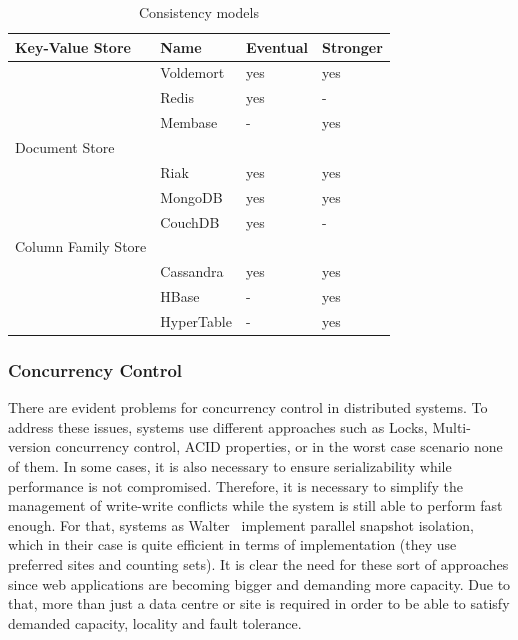 \begin{table}[h]
		\begin{center}
    			\begin{tabular}{ | p{5cm} | l | l | l |}
   			\hline
			Key-Value Store & Name & Eventual & Stronger \\ \hline   		
			 & Voldemort & yes & yes\\ \hline
			 & Redis & yes & - \\ \hline
			 & Membase & - & yes\\ \hline
			
			Document Store &  &  & \\ \hline
			 & Riak & yes & yes \\ \hline			
			 & MongoDB & yes & yes \\ \hline
			 & CouchDB & yes & - \\ \hline
			Column Family Store &  &  & \\ \hline
			 & Cassandra & yes & yes \\ \hline
			 & HBase & - & yes \\ \hline
			 & HyperTable & - & yes \\ \hline
    			\end{tabular}
		\end{center}
		\caption{Consistency models}
		\label{table:consistency}
		\end{table}	

	\subsubsection{Concurrency Control}\label{sub-concurrency}
	There are evident problems for concurrency control in distributed systems. To address these issues, systems use different approaches such as Locks, Multi-version concurrency control, ACID properties, or in the worst case scenario none of them. In some cases, it is also necessary to ensure serializability while performance is not compromised. Therefore, it is necessary to simplify the management of write-write conflicts while the system is still able to perform fast enough. For that, systems as Walter~\cite{Sovran:2011} implement parallel snapshot isolation, which in their case is quite efficient in terms of implementation (they use preferred sites and counting sets). It is clear the need for these sort of approaches since web applications are becoming bigger and demanding more capacity. Due to that, more than just a data centre or site is required in order to be able to satisfy demanded capacity, locality and fault tolerance.
	

